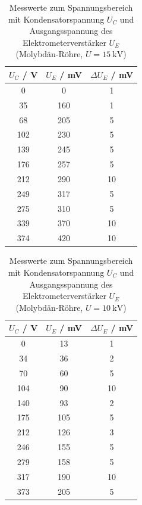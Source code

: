 \documentclass{article}
\begin{document}
\begin{table}[H]
    \centering
    \caption{Messwerte zum Spannungsbereich mit Kondensatorspannung $U_C$ und Ausgangsspannung des Elektrometerverstärker $U_E$ (Molybdän-Röhre, $U = \SI{15}{\kilo\volt}$)}
    \begin{tabular}{|c|c|c|}
        \hline
        $U_C$ / \si{\volt} & $U_E$ / \si{\milli\volt} & $\Delta U_E$ / \si{\milli\volt} \\ \hline \hline
         0 & 0 & 1 \\ \hline
         35 & 160 & 1 \\ \hline
         68 & 205 & 5 \\ \hline
         102 & 230 & 5 \\ \hline
         139 & 245 & 5 \\ \hline
         176 & 257 & 5 \\ \hline
         212 & 290 & 10 \\ \hline
         249 & 317 & 5 \\ \hline
         275 & 310 & 5 \\ \hline
         339 & 370 & 10 \\ \hline
         374 & 420 & 10 \\ \hline
    \end{tabular}
    \label{tab:MesswerteDosimetrie1a}
\end{table}

\begin{table}[H]
    \centering
    \caption{Messwerte zum Spannungsbereich mit Kondensatorspannung $U_C$ und Ausgangsspannung des Elektrometerverstärker $U_E$ (Molybdän-Röhre, $U = \SI{10}{\kilo\volt}$)}
    \begin{tabular}{|c|c|c|}
        \hline
        $U_C$ / \si{\volt} & $U_E$ / \si{\milli\volt} & $\Delta U_E$ / \si{\milli\volt} \\ \hline \hline
         0 & 13 & 1 \\ \hline
         34 & 36 & 2 \\ \hline
         70 & 60 & 5 \\ \hline
         104 & 90 & 10 \\ \hline
         140 & 93 & 2 \\ \hline
         175 & 105 & 5 \\ \hline
         212 & 126 & 3 \\ \hline
         246 & 155 & 5 \\ \hline
         279 & 158 & 5 \\ \hline
         317 & 190 & 10 \\ \hline
         373 & 205 & 5 \\ \hline
    \end{tabular}
    \label{tab:MesswerteDosimetrie1b}
\end{table}
\end{document}
